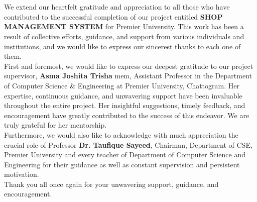 \section*{}
\vspace{2cm}
We extend our heartfelt gratitude and appreciation to all those who have contributed to the successful completion of our project entitled \textbf{SHOP MANAGEMENT SYSTEM} for Premier University. This work has been a result of collective efforts, guidance, and support from various individuals and institutions, and we would like to express our sincerest thanks to each one of them.\\[3ex]
First and foremost, we would like to express our deepest gratitude to our project supervisor, \textbf{Asma Joshita Trisha} mem, Assistant Professor in the Department of Computer Science \& Engineering at Premier University, Chattogram. Her expertise, continuous guidance, and unwavering support have been invaluable throughout the entire project. Her insightful suggestions, timely feedback, and encouragement have greatly contributed to the success of this endeavor. We are truly grateful for her mentorship.\\[3ex]
Furthermore, we would also like to acknowledge with much appreciation the crucial role of Professor \textbf{Dr. Taufique Sayeed}, Chairman, Department of CSE, Premier University and every teacher of Department of Computer Science and Engineering for their guidance as well as
constant supervision and persistent motivation.\\[3ex]
Thank you all once again for your unwavering support, guidance, and encouragement.

